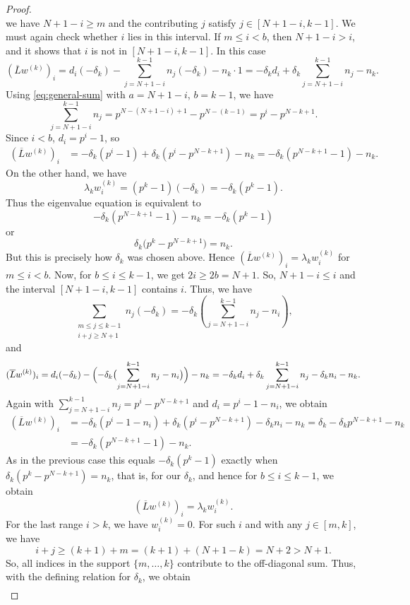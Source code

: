 \documentclass[10pt,a4paper]{amsart}
\begin{document}
\begin{proof}
\[	\]
	we have $N+1-i \ge m$ and the contributing $j$ satisfy $j\in [N+1-i,k-1].$ 	We must again check whether $i$ lies in this interval. If $m\le i<b$, then  $N+1-i > i$, and it shows that  $i$ is not in $[N+1-i,k-1]$. In this case
	\[
	(\overline{L}w^{(k)})_i
	= d_i(-\delta_k) - \sum_{j=N+1-i}^{k-1} n_j(-\delta_k) - n_k\cdot 1
	= -\delta_k d_i + \delta_k\sum_{j=N+1-i}^{k-1} n_j - n_k.
	\]
	Using \eqref{eq:general-sum} with $a=N+1-i$, $b=k-1$, we have
	\[
	\sum_{j=N+1-i}^{k-1} n_j
	= p^{N-(N+1-i)+1}-p^{N-(k-1)}
	= p^{i}-p^{N-k+1}.
	\]
	Since $i<b$, $d_i=p^i-1$, so
	\begin{align*}
		(\overline{L}w^{(k)})_i
		&= -\delta_k(p^i-1) + \delta_k(p^i-p^{N-k+1}) - n_k= -\delta_k(p^{N-k+1}-1) - n_k.
	\end{align*}
	On the other hand, we have
	\[
	\lambda_k w^{(k)}_i = (p^k-1)(-\delta_k) = -\delta_k(p^k-1).
	\]
	Thus the eigenvalue equation is equivalent to
	\[
	-\delta_k(p^{N-k+1}-1) - n_k = -\delta_k(p^k-1)
	\]
	or
	\[
	\delta_k\bigl(p^k-p^{N-k+1}\bigr) = n_k.
	\]
	But this is precisely how $\delta_k$ was chosen above. Hence
	$(\overline{L}w^{(k)})_i=\lambda_k w^{(k)}_i$ for $m\le i<b$. Now, for $b\le i\le k-1$, we get $2i\ge 2b=N+1$. So, $N+1-i\le i$ and the interval
	$[N+1-i,k-1]$ contains $i$. Thus, we have
	\[
	\sum_{\substack{m\le j\le k-1\\ i+j\ge N+1}} n_j(-\delta_k)
	= -\delta_k\left(\sum_{j=N+1-i}^{k-1} n_j - n_i\right),
	\]
	and
	\[
	(\overline{L}w^{(k)})_i
	= d_i(-\delta_k) -\Bigl(-\delta_k\bigl(\sum_{j=N+1-i}^{k-1} n_j - n_i\bigr)\Bigr)
	- n_k
	= -\delta_k d_i + \delta_k\sum_{j=N+1-i}^{k-1}n_j - \delta_k n_i - n_k.
	\]
	Again with $\sum_{j=N+1-i}^{k-1}n_j=p^i-p^{N-k+1}$ and
	$d_i=p^i-1-n_i$, we obtain
	\begin{align*}
		(\overline{L}w^{(k)})_i
		&= -\delta_k(p^i-1-n_i) + \delta_k(p^i-p^{N-k+1}) - \delta_k n_i - n_k= \delta_k - \delta_k p^{N-k+1} - n_k\\
		&= -\delta_k(p^{N-k+1}-1) - n_k.
	\end{align*}
	As in the previous case this equals $-\delta_k(p^k-1)$ exactly when
	$\delta_k(p^k-p^{N-k+1})=n_k$, that is, for our $\delta_k$, and hence for $b\le i\le k-1$, we obtain
	\[
	(\overline{L}w^{(k)})_i = \lambda_k w^{(k)}_i.
	\]
	For the last range $i>k$, we have $w^{(k)}_i=0$. For such $i$ and with any $j\in[m,k]$, we have
	\[
	i+j \ge (k+1)+m = (k+1)+(N+1-k)=N+2>N+1.
	\]
	So, all indices in the support $\{m,\dots,k\}$ contribute to the off-diagonal sum. Thus, with the defining relation for $\delta_k$, we obtain
	\begin{align*}

\end{align*}
\end{proof}
\end{document}
